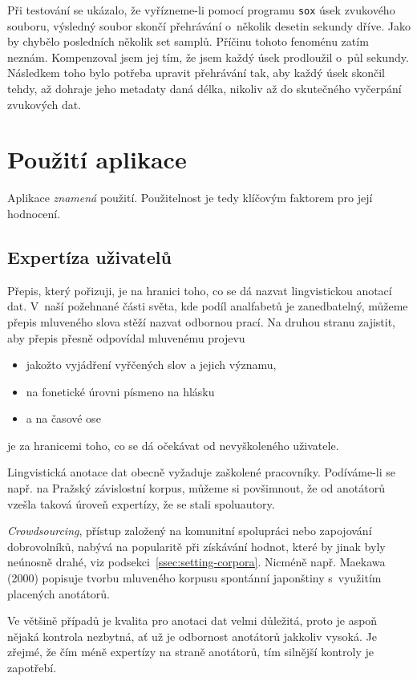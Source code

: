 Při testování se ukázalo, že vyřízneme-li pomocí programu \texttt{sox} úsek
zvukového souboru, výsledný soubor skončí přehrávání o~několik desetin sekundy
dříve. Jako by chybělo posledních několik set samplů. Příčinu tohoto fenoménu
zatím neznám. Kompenzoval jsem jej tím, že jsem každý úsek prodloužil o~půl
sekundy. Následkem toho bylo potřeba upravit přehrávání tak, aby každý úsek
skončil tehdy, až dohraje jeho metadaty daná délka, nikoliv až do skutečného
vyčerpání zvukových dat.


\section{Použití aplikace}

Aplikace {\em znamená} použití. Použitelnost je tedy klíčovým faktorem pro její hodnocení.

\subsection{Expertíza uživatelů}
\label{ssec:user-expertise}

Přepis, který pořizuji, je na hranici toho, co se dá nazvat lingvistickou
anotací dat. V~naší požehnané části světa, kde podíl analfabetů je zanedbatelný,
můžeme přepis mluveného slova stěží nazvat odbornou prací. Na druhou stranu zajistit, aby
přepis přesně odpovídal mluvenému projevu
\begin{itemize}
\item{jakožto vyjádření vyřčených slov a jejich významu,}
\item{na fonetické úrovni písmeno na hlásku}
\item{a na časové ose}
\end{itemize}
je za hranicemi toho, co se dá očekávat od nevyškoleného uživatele.

Lingvistická anotace dat obecně vyžaduje zaškolené pracovníky. Podíváme-li se
např. na Pražský závislostní korpus, můžeme si povšimnout, že od anotátorů
vzešla taková úroveň expertízy, že se stali spoluautory\cite{hajivc2005complex}.

{\em Crowdsourcing}, přístup založený na komunitní spolupráci nebo zapojování
dobrovolníků, nabývá na popularitě při získávání hodnot, které by jinak byly
neúnosně drahé, viz podsekci~\ref{ssec:setting-corpora}. Nicméně např.
Maekawa (2000)\cite{maekawa2000spontaneous} popisuje tvorbu
mluveného korpusu spontánní japonštiny s~využitím placených anotátorů.

Ve většině případů je kvalita pro anotaci dat velmi důležitá, proto je aspoň
nějaká kontrola nezbytná, ať už je odbornost anotátorů jakkoliv vysoká. Je
zřejmé, že čím méně expertízy na straně anotátorů, tím silnější kontroly je
zapotřebí.

